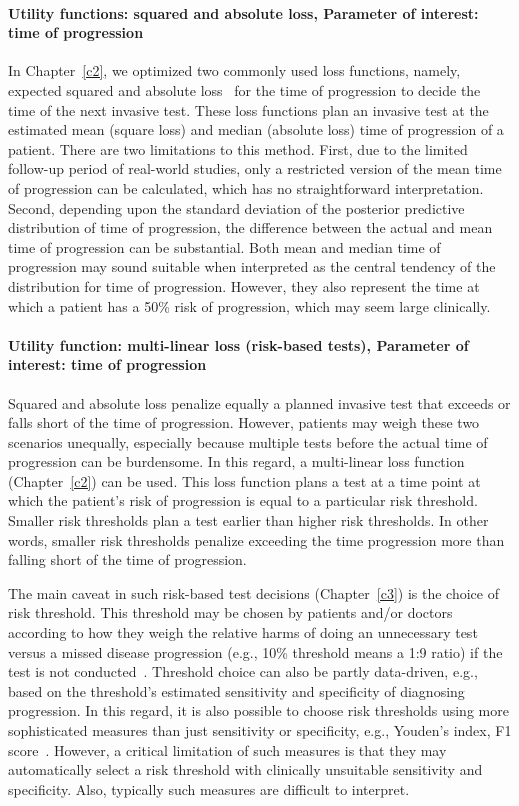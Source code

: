 \paragraph{Utility functions: squared and absolute loss, Parameter of interest: time of progression} In Chapter~\ref{c2}, we optimized two commonly used loss functions, namely, expected squared and absolute loss~\citep{robertBayesianChoice} for the time of progression to decide the time of the next invasive test. These loss functions plan an invasive test at the estimated mean (square loss) and median (absolute loss) time of progression of a patient. There are two limitations to this method. First, due to the limited follow-up period of real-world studies, only a restricted version of the mean time of progression can be calculated, which has no straightforward interpretation. Second, depending upon the standard deviation of the posterior predictive distribution of time of progression, the difference between the actual and mean time of progression can be substantial. Both mean and median time of progression may sound suitable when interpreted as the central tendency of the distribution for time of progression. However, they also represent the time at which a patient has a 50\% risk of progression, which may seem large clinically.

\paragraph{Utility function: multi-linear loss (risk-based tests), Parameter of interest: time of progression} Squared and absolute loss penalize equally a planned invasive test that exceeds or falls short of the time of progression. However, patients may weigh these two scenarios unequally, especially because multiple tests before the actual time of progression can be burdensome. In this regard, a multi-linear loss function (Chapter~\ref{c2}) can be used. This loss function plans a test at a time point at which the patient's risk of progression is equal to a particular risk threshold. Smaller risk thresholds plan a test earlier than higher risk thresholds. In other words, smaller risk thresholds penalize exceeding the time progression more than falling short of the time of progression. 

The main caveat in such risk-based test decisions (Chapter~\ref{c3}) is the choice of risk threshold. This threshold may be chosen by patients and/or doctors according to how they weigh the relative harms of doing an unnecessary test versus a missed disease progression (e.g., 10\% threshold means a 1:9 ratio) if the test is not conducted~\citep{vickers2006decision}. Threshold choice can also be partly data-driven, e.g., based on the threshold's estimated sensitivity and specificity of diagnosing progression. In this regard, it is also possible to choose risk thresholds using more sophisticated measures than just sensitivity or specificity, e.g., Youden's index, F1 score~\citep{lopez2014optimalcutpoints}. However, a critical limitation of such measures is that they may automatically select a risk threshold with clinically unsuitable sensitivity and specificity. Also, typically such measures are difficult to interpret.

